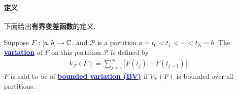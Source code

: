 \newpage
\paragraph{定义}
	下面给出\textbf{有界变差函数}的定义.
	\begin{defn}\label{def 4.4.2}
		Suppose $F : [a , b] \rightarrow \mathbb{C}$, and $\mathcal{P}$ is a partition $a = t_0 < t_1 < \cdots < t_N = b$. The \underline{\textcolor{blue}{\textbf{variation}}} of $F$ on this partition $\mathcal{P}$ is defined by
		\begin{align}
			V_{\mathcal{P}}(F) = \sum_{j = 1}^{N}{\left| F(t_j) - F(t_{j - 1}) \right|}
		\end{align}
		$F$ is said to be of \underline{\textcolor{blue}{\textbf{bounded variation (BV)}}} if $V_{\mathcal{P}}(F)$ is bounded over all partitions.
	\end{defn}

